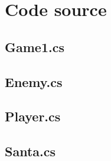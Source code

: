 \documentclass[11pt,a4paper]{article} %
\date{\today}								%
\begin{document}
	
	
	\tableofcontents
	
	
	\section{Code source}
	
	\subsection{Game1.cs}
	
	
	\subsection{Enemy.cs}
	
	
	\subsection{Player.cs}
	
	
	\subsection{Santa.cs}
	
	
	
\end{document}
